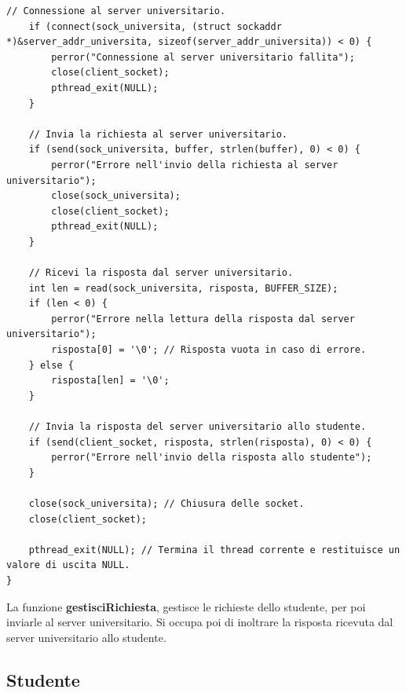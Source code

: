 \documentclass[12pt]{article}
\begin{document}
\begin{lstlisting}[style=CStyle]
    // Connessione al server universitario.
    if (connect(sock_universita, (struct sockaddr *)&server_addr_universita, sizeof(server_addr_universita)) < 0) {
        perror("Connessione al server universitario fallita");
        close(client_socket);
        pthread_exit(NULL);
    }

    // Invia la richiesta al server universitario.
    if (send(sock_universita, buffer, strlen(buffer), 0) < 0) {
        perror("Errore nell'invio della richiesta al server universitario");
        close(sock_universita);
        close(client_socket);
        pthread_exit(NULL);
    }

    // Ricevi la risposta dal server universitario.
    int len = read(sock_universita, risposta, BUFFER_SIZE);
    if (len < 0) {
        perror("Errore nella lettura della risposta dal server universitario");
        risposta[0] = '\0'; // Risposta vuota in caso di errore.
    } else {
        risposta[len] = '\0';
    }

    // Invia la risposta del server universitario allo studente.
    if (send(client_socket, risposta, strlen(risposta), 0) < 0) {
        perror("Errore nell'invio della risposta allo studente");
    }

    close(sock_universita); // Chiusura delle socket.
    close(client_socket);

    pthread_exit(NULL); // Termina il thread corrente e restituisce un valore di uscita NULL.
}
\end{lstlisting}

La funzione \textbf{gestisciRichiesta}, gestisce le richieste dello studente, per poi inviarle al server universitario. Si occupa poi di inoltrare la risposta ricevuta dal server universitario allo studente.

\subsection{Studente}
\end{document}

